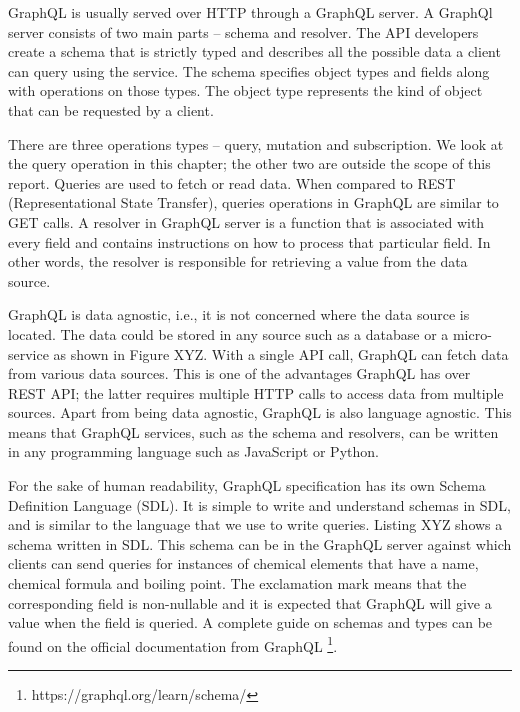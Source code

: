 GraphQL is usually served over HTTP through a GraphQL server. A GraphQl server consists of two main parts – schema and resolver. The API developers create a schema that is strictly typed and describes all the possible data a client can query using the service. The schema specifies object types and fields along with operations on those types. The object type represents the kind of object that can be requested by a client. 

There are three operations types – query, mutation and subscription.  We look at the query operation in this chapter; the other two are outside the scope of this report. Queries are used to fetch or read data. When compared to REST (Representational State Transfer),  queries operations in GraphQL are similar to GET calls.  A resolver in GraphQL server is a function that is associated with every field and contains instructions on how to process that particular field. In other words, the resolver is responsible for retrieving a value from the data source.

GraphQL is data agnostic, i.e., it is not concerned where the data source is located. The data could be stored in any source such as a database or a micro-service as shown in Figure XYZ. With a single API call, GraphQL can fetch data from various data sources. This is one of the advantages GraphQL has over REST API; the latter requires multiple HTTP calls to access data from multiple sources.  Apart from being data agnostic, GraphQL is also language agnostic. This means that GraphQL services, such as the schema and resolvers, can be written in any programming language such as JavaScript or Python.

For the sake of human readability, GraphQL specification has its own Schema Definition Language (SDL). It is simple to write and understand schemas in SDL, and is similar to the language that we use to write queries. Listing XYZ shows a schema written in SDL. This schema can be in the GraphQL server against which clients can send queries for instances of chemical elements that have a name, chemical formula and boiling point. The exclamation mark means that the corresponding field is non-nullable and it is expected that GraphQL will give a value when the field is queried. A complete guide on schemas and types can be found on the official documentation from GraphQL \footnote{https://graphql.org/learn/schema/}. 

